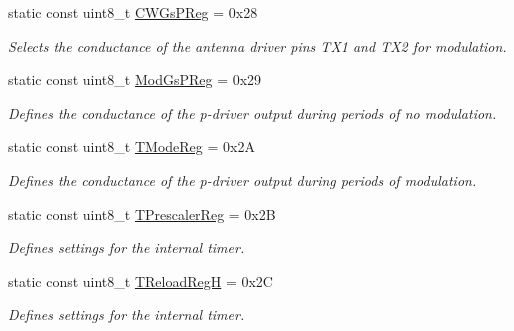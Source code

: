 \begin{DoxyCompactItemize}
\mbox{\label{classMFRC522_ae9dab4aef1658240f8ea032496311c69}} 
static const uint8\+\_\+t \hyperlink{classMFRC522_ae9dab4aef1658240f8ea032496311c69}{C\+W\+Gs\+P\+Reg} = 0x28
\begin{DoxyCompactList}\small\item\em Selects the conductance of the antenna driver pins T\+X1 and T\+X2 for modulation. \end{DoxyCompactList}\item 
\mbox{\label{classMFRC522_a94e96f5d58f9f52756235366a0c8a53a}} 
static const uint8\+\_\+t \hyperlink{classMFRC522_a94e96f5d58f9f52756235366a0c8a53a}{Mod\+Gs\+P\+Reg} = 0x29
\begin{DoxyCompactList}\small\item\em Defines the conductance of the p-\/driver output during periods of no modulation. \end{DoxyCompactList}\item 
\mbox{\label{classMFRC522_a3caf3862116749118e52431d31048f68}} 
static const uint8\+\_\+t \hyperlink{classMFRC522_a3caf3862116749118e52431d31048f68}{T\+Mode\+Reg} = 0x2A
\begin{DoxyCompactList}\small\item\em Defines the conductance of the p-\/driver output during periods of modulation. \end{DoxyCompactList}\item 
\mbox{\label{classMFRC522_a748558ee5f116ea8c16488dc42a9009e}} 
static const uint8\+\_\+t \hyperlink{classMFRC522_a748558ee5f116ea8c16488dc42a9009e}{T\+Prescaler\+Reg} = 0x2B
\begin{DoxyCompactList}\small\item\em Defines settings for the internal timer. \end{DoxyCompactList}\item 
\mbox{\label{classMFRC522_adb9c85f5225d44862e74223efaea249d}} 
static const uint8\+\_\+t \hyperlink{classMFRC522_adb9c85f5225d44862e74223efaea249d}{T\+Reload\+RegH} = 0x2C
\begin{DoxyCompactList}\small\item\em Defines settings for the internal timer. \end{DoxyCompactList}\item 

\end{DoxyCompactItemize}
